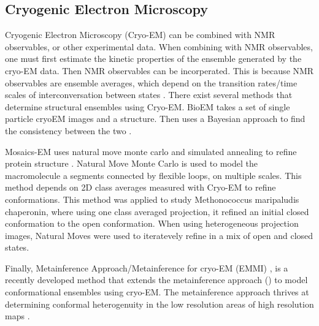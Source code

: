 \documentclass{article}
\begin{document}
\subsection{Cryogenic Electron Microscopy} 

Cryogenic Electron Microscopy (Cryo-EM) can be combined with NMR observables, or other experimental data. When combining with NMR observables, one must first estimate the kinetic properties of the ensemble generated by the cryo-EM data. Then NMR observables can be incorperated. This is because NMR observables are ensemble averages, which depend on the transition rates/time scales of interconversation between states \cite{bonomiDeterminationProteinStructural2019}. There exist several methods that determine structural ensembles using Cryo-EM.  
BioEM takes a set of single particle cryoEM images and a structure. Then uses a Bayesian approach to find the consistency between the two \cite{cossioBayesianAnalysisIndividual2013} .

Mosaics-EM \cite{zhangMultiscaleNaturalMoves2012} uses natural move monte carlo and simulated annealing to refine protein structure \cite{kirkpatrickOptimizationSimulatedAnnealing1983}.  Natural Move Monte Carlo is used to model the macromolecule a segments connected by flexible loops, on multiple scales. 
This method depends on 2D class averages measured with Cryo-EM to refine conformations.
This method was applied to study Methonococcus maripaludis chaperonin, where using one class averaged projection, it refined an initial closed conformation to the open conformation. 
When using heterogeneous projection images, Natural Moves were used to iteratevely refine in a mix of open and closed states.

Finally, Metainference Approach/Metainference for cryo-EM (EMMI) \cite{bonomiSimultaneousDeterminationProtein2018},\cite{bonomiBayesianWeighingElectron2019} is a recently developed method that extends the metainference approach (\cite{bonomiMetainferenceBayesianInference2016}) to model conformational ensembles using cryo-EM. The metainference approach thrives at determining conformal heterogenuity in the low resolution areas of high resolution maps \cite{bonomiMetainferenceBayesianInference2016}.
  



\printbibliography
\end{document}
